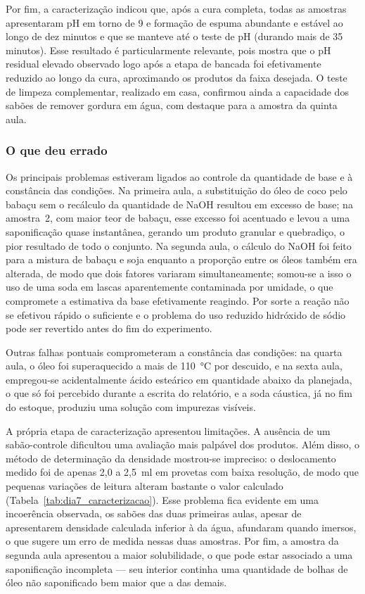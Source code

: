 Por fim, a caracterização indicou que, após a cura completa, todas as amostras apresentaram pH em torno de 9 e formação de espuma abundante e estável ao longo de dez minutos e que se manteve até o teste de pH (durando mais de 35 minutos). Esse resultado é particularmente relevante, pois mostra que o pH residual elevado observado logo após a etapa de bancada foi efetivamente reduzido ao longo da cura, aproximando os produtos da faixa desejada. O teste de limpeza complementar, realizado em casa, confirmou ainda a capacidade dos sabões de remover gordura em água, com destaque para a amostra da quinta aula.

\subsubsection{O que deu errado}

Os principais problemas estiveram ligados ao controle da quantidade de base e à constância das condições. Na primeira aula, a substituição do óleo de coco pelo babaçu sem o recálculo da quantidade de NaOH resultou em excesso de base; na amostra~2, com maior teor de babaçu, esse excesso foi acentuado e levou a uma saponificação quase instantânea, gerando um produto granular e quebradiço, o pior resultado de todo o conjunto. Na segunda aula, o cálculo do NaOH foi feito para a mistura de babaçu e soja enquanto a proporção entre os óleos também era alterada, de modo que dois fatores variaram simultaneamente; somou-se a isso o uso de uma soda em lascas aparentemente contaminada por umidade, o que compromete a estimativa da base efetivamente reagindo. Por sorte a reação não se efetivou rápido o suficiente e o problema do uso reduzido hidróxido de sódio pode ser revertido antes do fim do experimento.

Outras falhas pontuais comprometeram a constância das condições: na quarta aula, o óleo foi superaquecido a mais de 110~°C por descuido, e na sexta aula, empregou-se acidentalmente ácido esteárico em quantidade abaixo da planejada, o que só foi percebido durante a escrita do relatório, e a soda cáustica, já no fim do estoque, produziu uma solução com impurezas visíveis.

A própria etapa de caracterização apresentou limitações. A ausência de um sabão-controle dificultou uma avaliação mais palpável dos produtos. Além disso, o método de determinação da densidade mostrou-se impreciso: o deslocamento medido foi de apenas 2,0 a 2,5~ml em provetas com baixa resolução, de modo que pequenas variações de leitura alteram bastante o valor calculado (Tabela~\ref{tab:dia7_caracterizacao}). Esse problema fica evidente em uma incoerência observada, os sabões das duas primeiras aulas, apesar de apresentarem densidade calculada inferior à da água, afundaram quando imersos, o que sugere um erro de medida nessas duas amostras. Por fim, a amostra da segunda aula apresentou a maior solubilidade, o que pode estar associado a uma saponificação incompleta — seu interior continha uma quantidade de bolhas de óleo não saponificado bem maior que a das demais.


